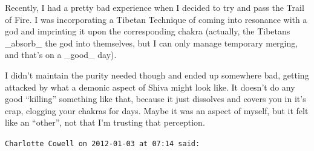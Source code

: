 \begin{footnotesize}
\begin{sffamily}
Recently, I had a pretty bad experience when I decided to try and pass the Trail of Fire. I was incorporating a Tibetan Technique of coming into resonance with a god and imprinting it upon the corresponding chakra (actually, the Tibetans \_absorb\_ the god into themselves, but I can only manage temporary merging, and that's on a \_good\_ day).

I didn't maintain the purity needed though and ended up somewhere bad, getting attacked by what a demonic aspect of Shiva might look like. It doesn't do any good ``killing'' something like that, because it just dissolves and covers you in it's crap, clogging your chakras for days. Maybe it was an aspect of myself, but it felt like an ``other'', not that I'm trusting that perception.

\hfill

\texttt{Charlotte Cowell on 2012-01-03 at 07:14 said:}


\end{sffamily}
\end{footnotesize}
